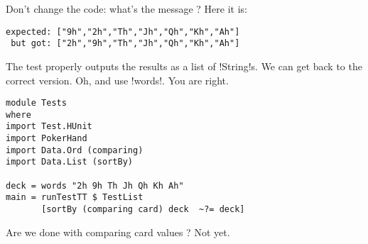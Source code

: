 \failure Don't change the code: what's the message ?
\lhA \failure Here it is:
\begin{verbatim}
expected: ["9h","2h","Th","Jh","Qh","Kh","Ah"]
 but got: ["2h","9h","Th","Jh","Qh","Kh","Ah"]
\end{verbatim}
The test properly outputs the results as a list of \il!String!s. We can get back to the correct version. Oh, and use \il!words!.
\lhN You are right.
\begin{lstlisting}[frame=single]
module Tests
where 
import Test.HUnit
import PokerHand
import Data.Ord (comparing)
import Data.List (sortBy)

deck = words "2h 9h Th Jh Qh Kh Ah"
main = runTestTT $ TestList 
       [sortBy (comparing card) deck  ~?= deck]
\end{lstlisting} %
\success Are we done with comparing card values ?
\lhA Not yet.
\lhend